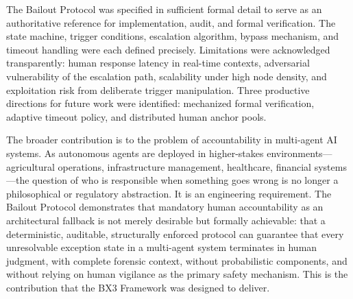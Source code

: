 The Bailout Protocol was specified in sufficient formal detail to serve as an authoritative reference for implementation, audit, and formal verification. The state machine, trigger conditions, escalation algorithm, bypass mechanism, and timeout handling were each defined precisely. Limitations were acknowledged transparently: human response latency in real-time contexts, adversarial vulnerability of the escalation path, scalability under high node density, and exploitation risk from deliberate trigger manipulation. Three productive directions for future work were identified: mechanized formal verification, adaptive timeout policy, and distributed human anchor pools.

The broader contribution is to the problem of accountability in multi-agent AI systems. As autonomous agents are deployed in higher-stakes environments---agricultural operations, infrastructure management, healthcare, financial systems---the question of who is responsible when something goes wrong is no longer a philosophical or regulatory abstraction. It is an engineering requirement. The Bailout Protocol demonstrates that mandatory human accountability as an architectural fallback is not merely desirable but formally achievable: that a deterministic, auditable, structurally enforced protocol can guarantee that every unresolvable exception state in a multi-agent system terminates in human judgment, with complete forensic context, without probabilistic components, and without relying on human vigilance as the primary safety mechanism. This is the contribution that the BX3 Framework was designed to deliver.
